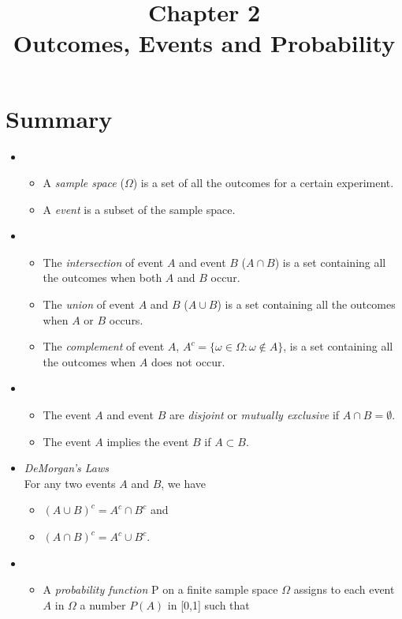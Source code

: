 \documentclass{article} %
\title{Chapter 2\\Outcomes, Events and Probability}
\author{
}
\begin{document}
\maketitle

\section{Summary}

\begin{itemize}
\item
\begin{itemize}
\item A {\em sample space} ($\Omega$) is a set of all the outcomes for a certain experiment.  
\item A {\em event} is a subset of the sample space. 
\end{itemize}
\item 
\begin{itemize}
\item The {\em intersection} of event $A$ and event $B$ ($A \cap B$) is a set containing all the outcomes when both $A$ and $B$ occur. 
\item The {\em union} of event $A$ and $B$  ($A \cup B$) is a set containing all the outcomes when $A$ or $B$ occurs. 
\item The {\em complement} of event $A$, $A^c = \{\omega \in \Omega: \omega \notin A\}$, is a set containing all the outcomes when $A$ does not occur.
\end{itemize}
\item 
\begin{itemize}
\item The event $A$ and event $B$ are {\em disjoint} or {\em mutually exclusive} if $A \cap B = \emptyset$.
\item The event $A$ implies the event $B$ if $A \subset B$. 
\end{itemize}
\item {\em DeMorgan's Laws}\\
For any two events $A$ and $B$, we have 
\begin{itemize}
\item $(A \cup B)^c = A^c \cap B^c$ and 
\item $(A \cap B)^c = A^c \cup B^c$. 
\end{itemize}
\item 
\begin{itemize}
\item A {\em probability function} P on a finite sample space $\Omega$ assigns to each event $A$ in $\Omega$ a number $P(A)$ in [0,1] such that

\end{itemize}
\end{itemize}
\end{document}
